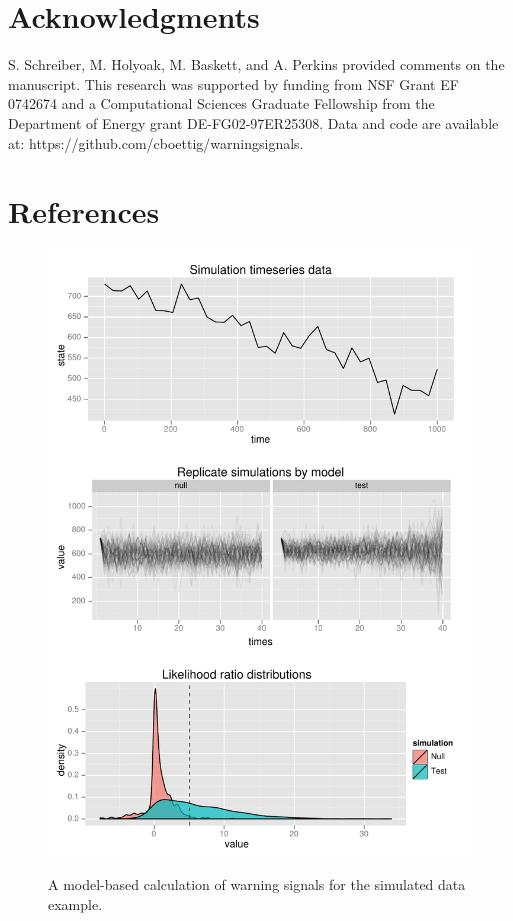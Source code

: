 \documentclass[authoryear,preprint,11pt]{elsarticle}
\begin{document}
\section{Acknowledgments}
S. Schreiber, M. Holyoak, M. Baskett, and A. Perkins provided comments on the manuscript.  This research was supported by funding from NSF Grant EF 0742674 and a Computational Sciences Graduate Fellowship from the Department of Energy grant DE-FG02-97ER25308. Data and code are available at: https://github.com/cboettig/warningsignals. 




 \section{References}%
 


 \begin{figure}
   \begin{center}
     \includegraphics[width=\linewidth]{figures/Simulation_warningsignal.pdf}
     \label{fig:simulation}
     \caption{A model-based calculation of warning signals for the simulated data example.}
  \end{center}
 \end{figure}
\end{document}

